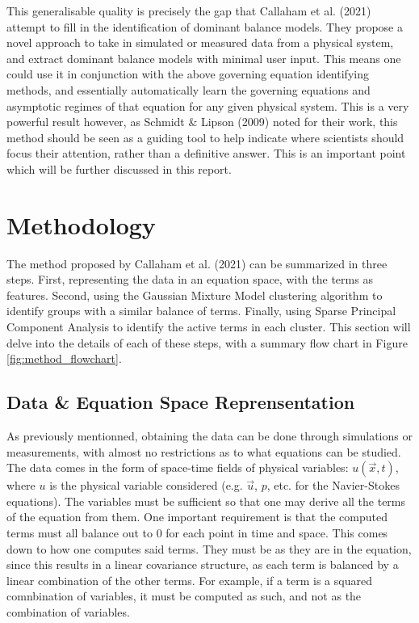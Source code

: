 \documentclass[12pt]{report} %
\begin{document}
\vspace{5mm}

This generalisable quality is precisely the gap that Callaham et al. (2021)\cite{callaham2021learning} attempt to fill in the identification of dominant balance models. They propose a novel approach to take in simulated or measured data from a physical system, and extract dominant balance models with minimal user input. This means one could use it in conjunction with the above governing equation identifying methods, and essentially automatically learn the governing equations and asymptotic regimes of that equation for any given physical system. This is a very powerful result however, as Schmidt \& Lipson (2009) noted for their work, this method should be seen as a guiding tool to help indicate where scientists should focus their attention, rather than a definitive answer. This is an important point which will be further discussed in this report.


\chapter{Methodology}

The method proposed by Callaham et al. (2021)\cite{callaham2021learning} can be summarized in three steps. First, representing the data in an equation space, with the terms as features. Second, using the Gaussian Mixture Model clustering algorithm to identify groups with a similar balance of terms. Finally, using Sparse Principal Component Analysis to identify the active terms in each cluster. This section will delve into the details of each of these steps, with a summary flow chart in Figure \ref{fig:method_flowchart}.

\section{Data \& Equation Space Reprensentation}

As previously mentionned, obtaining the data can be done through simulations or measurements, with almost no restrictions as to what equations can be studied. The data comes in the form of space-time fields of physical variables: $u(\vec{x}, t)$, where $u$ is the physical variable considered (e.g. $\vec{u}$, $p$, etc. for the Navier-Stokes equations). The variables must be sufficient so that one may derive all the terms of the equation from them. One important requirement is that the computed terms must all balance out to 0 for each point in time and space. This comes down to how one computes said terms. They must be as they are in the equation, since this results in a linear covariance structure, as each term is balanced by a linear combination of the other terms\cite[Supplementary Information]{callaham2021learning}. For example, if a term is a squared comnbination of variables, it must be computed as such, and not as the combination of variables.
\end{document}
